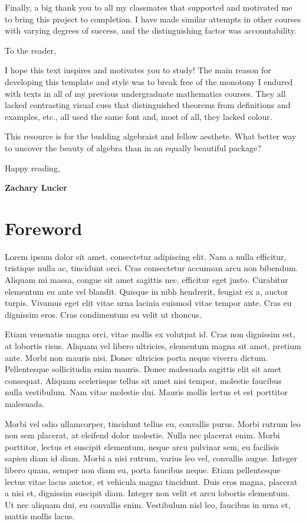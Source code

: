 \documentclass{bookneue}
\begin{document}
Finally, a big thank you to all my classmates that supported and motivated me to bring this project to completion. I have made similar attempts in other courses with varying degrees of success, and the distinguishing factor was accountability.

\vspace{12pt}

To the reader,

I hope this text inspires and motivates you to study! The main reason for developing this template and style was to break free of the monotony I endured with texts in all of my previous undergraduate mathematics courses. They all lacked contrasting visual cues that distinguished theorems from definitions and examples, etc., all used the same font and, most of all, they lacked colour.

This resource is for the budding algebraist and fellow aesthete. What better way to uncover the beauty of algebra than in an equally beautiful package?

\vspace{12pt}

Happy reading,

\textbf{Zachary Lucier}

\vfill\pagebreak

\chapter*{Foreword}

Lorem ipsum dolor sit amet, consectetur adipiscing elit. Nam a nulla efficitur, tristique nulla ac, tincidunt orci. Cras consectetur accumsan arcu non bibendum. Aliquam mi massa, congue sit amet sagittis nec, efficitur eget justo. Curabitur elementum eu ante vel blandit. Quisque in nibh hendrerit, feugiat ex a, auctor turpis. Vivamus eget elit vitae urna lacinia euismod vitae tempor ante. Cras eu dignissim eros. Cras condimentum eu velit ut rhoncus.

Etiam venenatis magna orci, vitae mollis ex volutpat id. Cras non dignissim est, at lobortis risus. Aliquam vel libero ultricies, elementum magna sit amet, pretium ante. Morbi non mauris nisi. Donec ultricies porta neque viverra dictum. Pellentesque sollicitudin enim mauris. Donec malesuada sagittis elit sit amet consequat. Aliquam scelerisque tellus sit amet nisi tempor, molestie faucibus nulla vestibulum. Nam vitae molestie dui. Mauris mollis lectus et est porttitor malesuada.

Morbi vel odio ullamcorper, tincidunt tellus eu, convallis purus. Morbi rutrum leo non sem placerat, at eleifend dolor molestie. Nulla nec placerat enim. Morbi porttitor, lectus et suscipit elementum, neque arcu pulvinar sem, eu facilisis sapien diam id diam. Morbi a nisi rutrum, varius leo vel, convallis augue. Integer libero quam, semper non diam eu, porta faucibus neque. Etiam pellentesque lectus vitae lacus auctor, et vehicula magna tincidunt. Duis eros magna, placerat a nisi et, dignissim suscipit diam. Integer non velit et arcu lobortis elementum. Ut nec aliquam dui, eu convallis enim. Vestibulum nisl leo, faucibus in urna et, mattis mollis lacus.
\end{document}
